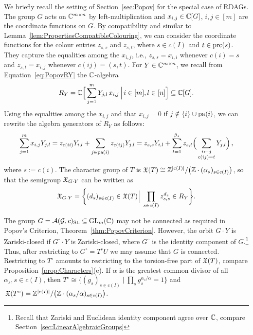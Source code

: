 We briefly recall the setting of Section~\ref{sec:Popov} for the special case of RDAGs. The group $G$ acts on $\mathbb C^{m \times n}$ by left-multiplication and $x_{i,j} \in \mathbb C[G]$, $i,j \in [m]$ are the coordinate functions on $G$. By compatibility and similar to Lemma~\ref{lem:PropertiesCompatibleColouring}, we can consider the coordinate functions for the colour entries $z_{s,s}$ and $z_{s,t}$, where $s \in c(I)$ and $t \in \operatorname{prc}(s)$. They capture the equalities among the $x_{i,j}$, i.e.,  $z_{s,s} =x_{i,i}$ whenever $c(i) = s$ and $z_{s,t} = x_{i,j}$ whenever $c(ij) = (s,t)$.
For $Y \in \mathbb C^{m \times n}$, we recall from Equation~\eqref{eq:PopovRY} the $\mathbb C$-algebra
	\[ R_Y=  \mathbb C \Big[ \sum_{j=1}^m Y_{j,l} \, x_{i,j} \, \Big\vert \, i \in [m], l \in [n] \Big] \subseteq \mathbb C[G]. \]
Using the equalities among the $x_{i,j}$ and that $x_{i,j} = 0$ if $j \notin \{i\} \cup \operatorname{pa}(i)$, we can rewrite the algebra generators of $R_Y$ as follows:
	\begin{equation}\label{eq:PopovGeneratorsAGc}
		\sum_{j=1}^m x_{i,j} Y_{j,l} = z_{c(ii)} Y_{i,l} + \sum_{j \in \operatorname{pa}(i)} z_{c(ij)} Y_{j,l}
		= z_{s,s} Y_{i,l} + \sum_{t=1}^{\beta_s} z_{s,t} \Big( \sum_{\substack{i \leftarrow j\\c(i j) = t}} Y_{j,l} \Big) \, ,
	\end{equation}
where $s := c(i)$.
The character group of $T$ is $\mathfrak{X}(T) \cong \mathbb Z^{|c(I)|} / \big( \mathbb Z \cdot (\alpha_s)_{s \in c(I)} \big)$, so that the semigroup $\mathfrak{X}_{G \cdot Y}$ can be written as
\begin{align*}
	\mathfrak{X}_{G \cdot Y} = \bigg\lbrace (d_s)_{s \in c(I)} \in \mathfrak{X}(T) \, \Big\vert \, \prod_{s \in c(I)} z_{s,s}^{d_s} \in R_Y \bigg\rbrace .
\end{align*}


\begin{remark}
	The group $G = \mathcal{A}(\mathcal{G}, c)_{\operatorname{SL}} \subseteq \operatorname{GL}_m(\mathbb C)$ may not be connected as required in Popov's Criterion,  Theorem~\ref{thm:PopovCriterion}. However, the orbit $G \cdot Y$ is Zariski-closed if $G^{\circ} \cdot Y$ is Zariski-closed, where $G^\circ$ is the identity component of $G$.\footnote{Recall that Zariski and Euclidean identity component agree over $\mathbb C$, compare Section~\ref{sec:LinearAlgebraicGroups}}
	Thus, after restricting to $G^\circ = T^\circ U$ we may assume that $G$ is connected. Restricting to $T^\circ$ amounts to restricting to the torsion-free part of $\mathfrak{X}(T)$, compare Proposition~\ref{prop:Characters}(e).
	If $\alpha$ is the greatest common divisor of all $\alpha_s, s \in c(I)$, then $T^\circ \cong \big\lbrace (g_s)_{s \in c(I)} \mid \prod_s g_s^{\alpha_s / \alpha} = 1 \big\rbrace$ and $\, \mathfrak{X}(T^{\circ}) = \mathbb Z^{|c(I)|} / \big( \mathbb Z \cdot (\alpha_s/\alpha)_{s \in c(I)} \big)$.
	\hfill\remSymbol
\end{remark}

